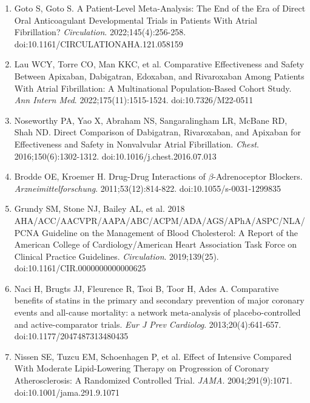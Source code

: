 \documentclass[12pt,a4paper]{article}
\begin{document}
\begin{enumerate}
\item Goto S, Goto S. A Patient-Level Meta-Analysis: The End of the Era of Direct Oral Anticoagulant Developmental Trials in Patients With Atrial Fibrillation? \textit{Circulation}. 2022;145(4):256-258. doi:10.1161/CIRCULATIONAHA.121.058159

\item Lau WCY, Torre CO, Man KKC, et al. Comparative Effectiveness and Safety Between Apixaban, Dabigatran, Edoxaban, and Rivaroxaban Among Patients With Atrial Fibrillation: A Multinational Population-Based Cohort Study. \textit{Ann Intern Med}. 2022;175(11):1515-1524. doi:10.7326/M22-0511

\item Noseworthy PA, Yao X, Abraham NS, Sangaralingham LR, McBane RD, Shah ND. Direct Comparison of Dabigatran, Rivaroxaban, and Apixaban for Effectiveness and Safety in Nonvalvular Atrial Fibrillation. \textit{Chest}. 2016;150(6):1302-1312. doi:10.1016/j.chest.2016.07.013

\item Brodde OE, Kroemer H. Drug-Drug Interactions of $\beta$-Adrenoceptor Blockers. \textit{Arzneimittelforschung}. 2011;53(12):814-822. doi:10.1055/s-0031-1299835

\item Grundy SM, Stone NJ, Bailey AL, et al. 2018 AHA/ACC/AACVPR/AAPA/ABC/ACPM/ADA/AGS/APhA/ASPC/NLA/PCNA Guideline on the Management of Blood Cholesterol: A Report of the American College of Cardiology/American Heart Association Task Force on Clinical Practice Guidelines. \textit{Circulation}. 2019;139(25). doi:10.1161/CIR.0000000000000625

\item Naci H, Brugts JJ, Fleurence R, Tsoi B, Toor H, Ades A. Comparative benefits of statins in the primary and secondary prevention of major coronary events and all-cause mortality: a network meta-analysis of placebo-controlled and active-comparator trials. \textit{Eur J Prev Cardiolog}. 2013;20(4):641-657. doi:10.1177/2047487313480435

\item Nissen SE, Tuzcu EM, Schoenhagen P, et al. Effect of Intensive Compared With Moderate Lipid-Lowering Therapy on Progression of Coronary Atherosclerosis: A Randomized Controlled Trial. \textit{JAMA}. 2004;291(9):1071. doi:10.1001/jama.291.9.1071
\end{enumerate}

\newpage
\end{document}
